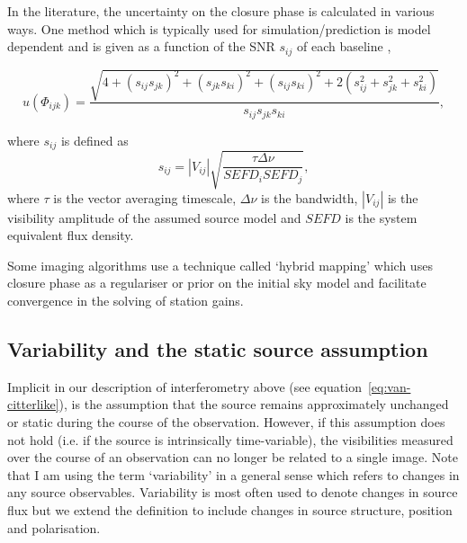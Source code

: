In the literature, the uncertainty on the closure phase is calculated in various ways. One method which is typically used for simulation/prediction is model dependent  and is given as a function of the SNR $s_{ij}$ of each baseline \citep{Rogers_1995},

\begin{equation}\label{eq:ucp}
u(\Phi_{ijk}) = \frac{\sqrt{4 + (s_{ij}s_{jk})^2 + (s_{jk}s_{ki})^2 + (s_{ij}s_{ki})^2 +
                        2(s_{ij}^2+s_{jk}^2+s_{ki}^2)}}{s_{ij}s_{jk}s_{ki}},
\end{equation}

\noindent where $s_{ij}$ is defined as
\begin{equation}
s_{ij}=|V_{ij}| \sqrt{\frac{ \tau \Delta \nu}{SEFD_i SEFD_j}},
\end{equation}\label{eq:snr}
where $\tau$ is the vector averaging timescale, $\Delta \nu$ is the bandwidth, $|V_{ij}|$ is the visibility amplitude of the assumed source model and $SEFD$ is the system equivalent flux density.


Some imaging algorithms use a technique called `hybrid mapping' \citep[e.g.][]{Skilling_1984,Bouman_2015,Chael_2016} which uses closure phase as a regulariser or prior on the initial sky model and facilitate convergence in the solving of station gains.

\subsection{Variability and the static source assumption}\label{sec:variability}
Implicit in our description of interferometry above (see equation~\ref{eq:van-citterlike}), is the assumption that the source remains approximately unchanged or static during the course of the observation. However, if this assumption does not hold (i.e. if the source is intrinsically time-variable), the visibilities measured over the course of an observation can no longer be related to a single image. 
Note that I am using the term `variability' in a general sense which refers to changes in any source observables. Variability is most often used to denote changes in source flux but we extend the definition to include changes in source structure, position and polarisation.


